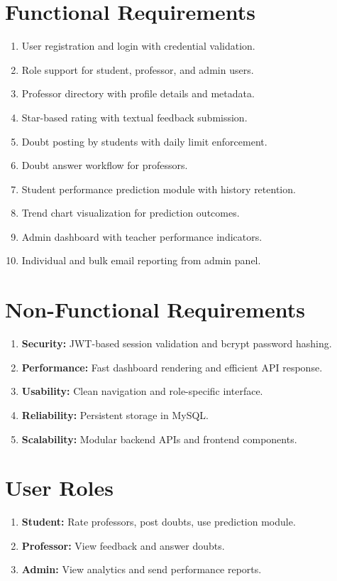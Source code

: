 \section{Functional Requirements}
\begin{enumerate}[leftmargin=1.5em]
    \item User registration and login with credential validation.
    \item Role support for student, professor, and admin users.
    \item Professor directory with profile details and metadata.
    \item Star-based rating with textual feedback submission.
    \item Doubt posting by students with daily limit enforcement.
    \item Doubt answer workflow for professors.
    \item Student performance prediction module with history retention.
    \item Trend chart visualization for prediction outcomes.
    \item Admin dashboard with teacher performance indicators.
    \item Individual and bulk email reporting from admin panel.
\end{enumerate}

\section{Non-Functional Requirements}
\begin{enumerate}[label=\Alph*., leftmargin=1.5em]
    \item \textbf{Security:} JWT-based session validation and bcrypt password hashing.
    \item \textbf{Performance:} Fast dashboard rendering and efficient API response.
    \item \textbf{Usability:} Clean navigation and role-specific interface.
    \item \textbf{Reliability:} Persistent storage in MySQL.
    \item \textbf{Scalability:} Modular backend APIs and frontend components.
\end{enumerate}

\section{User Roles}
\begin{enumerate}[label=\Alph*., leftmargin=1.5em]
    \item \textbf{Student:} Rate professors, post doubts, use prediction module.
    \item \textbf{Professor:} View feedback and answer doubts.
    \item \textbf{Admin:} View analytics and send performance reports.
\end{enumerate}

